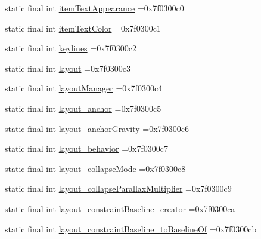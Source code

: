 \begin{DoxyCompactItemize}
static final int \mbox{\hyperlink{classbr_1_1unb_1_1cic_1_1mp_1_1marketmaster_1_1test_1_1R_1_1attr_ae727a0c70e90ca9a2492bfc4f9407e0a}{item\+Text\+Appearance}} =0x7f0300c0
\item 
static final int \mbox{\hyperlink{classbr_1_1unb_1_1cic_1_1mp_1_1marketmaster_1_1test_1_1R_1_1attr_ad1c23d85e2326dc9e19c3792b1b660b1}{item\+Text\+Color}} =0x7f0300c1
\item 
static final int \mbox{\hyperlink{classbr_1_1unb_1_1cic_1_1mp_1_1marketmaster_1_1test_1_1R_1_1attr_a8ed0ddc0ce3f2a07a70f539ab354c38a}{keylines}} =0x7f0300c2
\item 
static final int \mbox{\hyperlink{classbr_1_1unb_1_1cic_1_1mp_1_1marketmaster_1_1test_1_1R_1_1attr_ac68f09be1f704193550a3e2b2c6a92ef}{layout}} =0x7f0300c3
\item 
static final int \mbox{\hyperlink{classbr_1_1unb_1_1cic_1_1mp_1_1marketmaster_1_1test_1_1R_1_1attr_a51f463583d251337690a1e9b53a5af58}{layout\+Manager}} =0x7f0300c4
\item 
static final int \mbox{\hyperlink{classbr_1_1unb_1_1cic_1_1mp_1_1marketmaster_1_1test_1_1R_1_1attr_a1e04908eacca9c55ba8cb4949ea155c2}{layout\+\_\+anchor}} =0x7f0300c5
\item 
static final int \mbox{\hyperlink{classbr_1_1unb_1_1cic_1_1mp_1_1marketmaster_1_1test_1_1R_1_1attr_a45ebbf13b702dfa6c78843e78abefecc}{layout\+\_\+anchor\+Gravity}} =0x7f0300c6
\item 
static final int \mbox{\hyperlink{classbr_1_1unb_1_1cic_1_1mp_1_1marketmaster_1_1test_1_1R_1_1attr_a94ee51a9eba89fe7dc80b56274a859e1}{layout\+\_\+behavior}} =0x7f0300c7
\item 
static final int \mbox{\hyperlink{classbr_1_1unb_1_1cic_1_1mp_1_1marketmaster_1_1test_1_1R_1_1attr_a62a5793b4e8a42dd1336820343884db0}{layout\+\_\+collapse\+Mode}} =0x7f0300c8
\item 
static final int \mbox{\hyperlink{classbr_1_1unb_1_1cic_1_1mp_1_1marketmaster_1_1test_1_1R_1_1attr_adcf04def034dddfdc684efbdc1b1b843}{layout\+\_\+collapse\+Parallax\+Multiplier}} =0x7f0300c9
\item 
static final int \mbox{\hyperlink{classbr_1_1unb_1_1cic_1_1mp_1_1marketmaster_1_1test_1_1R_1_1attr_a54cbeb4b07ef4208e14246c468582f37}{layout\+\_\+constraint\+Baseline\+\_\+creator}} =0x7f0300ca
\item 
static final int \mbox{\hyperlink{classbr_1_1unb_1_1cic_1_1mp_1_1marketmaster_1_1test_1_1R_1_1attr_a77422150ad1a7922dd7f8d6981bcef49}{layout\+\_\+constraint\+Baseline\+\_\+to\+Baseline\+Of}} =0x7f0300cb

\end{DoxyCompactItemize}
